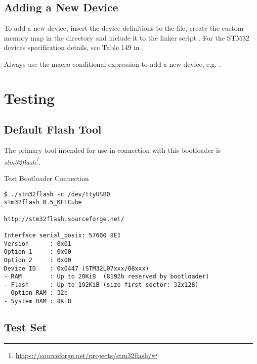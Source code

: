 \subsection{Adding a New Device}

To add a new device, insert the device definitions to the  file, create the custom memory map in the  directory and include it to the linker script  . For the STM32 devices specification details, see Table 149 in \cite{STM32:AN2606}.

Always use the macro conditional expression to add a new device, e.g. .



\clearpage
\section{Testing}

\subsection{Default Flash Tool}

The primary tool intended for use in connection with this bootloader is {\it stm32flash\footnote{\url{https://sourceforge.net/projects/stm32flash/}}}.

\begin{docCodeExampleTitled}{Test Bootloader Connection}
\begin{verbatim}
$ ./stm32flash -c /dev/ttyUSB0 
stm32flash 0.5_KETCube

http://stm32flash.sourceforge.net/

Interface serial_posix: 57600 8E1
Version      : 0x01
Option 1     : 0x00
Option 2     : 0x00
Device ID    : 0x0447 (STM32L07xxx/08xxx)
- RAM        : Up to 20KiB  (8192b reserved by bootloader)
- Flash      : Up to 192KiB (size first sector: 32x128)
- Option RAM : 32b
- System RAM : 8KiB
\end{verbatim}
\end{docCodeExampleTitled}

\subsection{Test Set}

